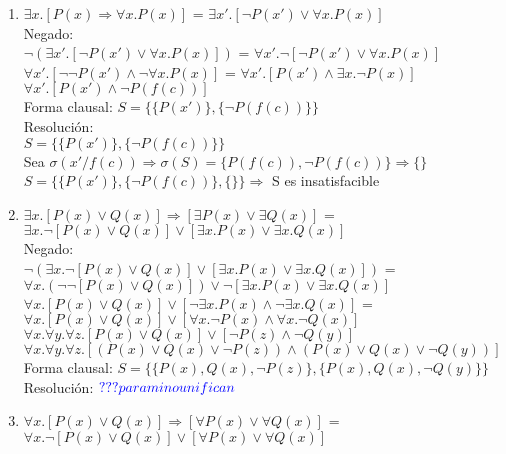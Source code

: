 \documentclass[10pt,a4paper]{article}
\begin{document}
\begin{enumerate}
    \item
    $\exists x. [P(x) \Rightarrow \forall x. P(x)]$  =  $\exists x'. [\neg P(x') \vee \forall x. P(x)]$ \\
    Negado: \\
    $\neg (\exists x'. [\neg P(x') \vee \forall x. P(x)])$  =  $ \forall x'. \neg [\neg P(x') \vee \forall x. P(x)]$ \\
    $ \forall x'. [ \neg \neg P(x') \wedge \neg \forall x. P(x)]$  =  $ \forall x'. [ P(x') \wedge \exists x. \neg P(x)]$ \\
    $ \forall x'. [ P(x') \wedge \neg P(f(c))]$ \\
    Forma clausal: $S=\{ \{ P(x') \} , \{ \neg P(f(c)) \} \}$ \\
    Resolución: \\
    $S=\{ \{P(x')\}, \{ \neg P(f(c))\}\}$\\
    Sea $\sigma(x' / f(c)) \Rightarrow \sigma(S)=\{ P(f(c)), \neg P(f(c))\} \Rightarrow \{\}$ \\
    $S=\{ \{P(x')\}, \{ \neg P(f(c))\}, \{\} \} \Rightarrow $ S es insatisfacible
    \item
    $ \exists x. [P(x) \vee Q(x)] \Rightarrow [\exists P(x) \vee \exists Q(x)]$  =  $ \exists x. \neg [P(x) \vee Q(x)] \vee [\exists x. P(x) \vee \exists x. Q(x)]$ \\
    Negado: \\
    $ \neg (\exists x. \neg [P(x) \vee Q(x)] \vee [\exists x. P(x) \vee \exists x. Q(x)])$  =  $ \forall x. (\neg \neg [P(x) \vee Q(x)]) \vee \neg [\exists x. P(x) \vee \exists x. Q(x)]$ \\
    $ \forall x. [P(x) \vee Q(x)] \vee [\neg \exists x. P(x) \wedge \neg \exists x. Q(x)]$  =  $ \forall x. [P(x) \vee Q(x)] \vee [\forall x. \neg P(x) \wedge \forall x. \neg Q(x)]$ \\
    $ \forall x. \forall y. \forall z. [P(x) \vee Q(x)] \vee [\neg P(z) \wedge \neg Q(y)]$ \\
    $ \forall x. \forall y. \forall z. [(P(x) \vee Q(x) \vee \neg P(z)) \wedge (P(x) \vee Q(x) \vee \neg Q(y))]$ \\
    Forma clausal: $S=\{\{P(x), Q(x), \neg P(z)\}, \{P(x), Q(x), \neg Q(y)\}\}$ \\
    Resolución: ${\color{blue}??? para mi no unifican}$
    \item
    $ \forall x. [P(x) \vee Q(x)] \Rightarrow [\forall P(x) \vee \forall Q(x)]$  =  $ \forall x. \neg [P(x) \vee Q(x)] \vee [\forall P(x) \vee \forall Q(x)]$ \\

\end{enumerate}
\end{document}
